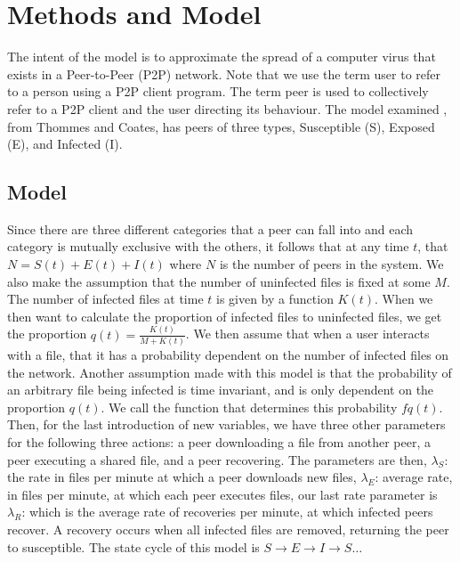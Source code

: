 \documentclass[12pt, oneside]{article}
\begin{document}
    \section{Methods and Model}
    
        The intent of the model is to approximate the spread of a computer virus that exists in a Peer-to-Peer (P2P) network. Note that we use the term user
        to refer to a person using a P2P client program. The term peer is used to collectively refer to a P2P client and the user directing its behaviour.
        The model examined \cite{1689197}, from Thommes and Coates, has peers of three types, Susceptible (S), Exposed (E), and Infected (I). 
    \subsection{Model}
        Since there are three different categories that a peer can fall into and each category is mutually exclusive with the others,
        it follows that at any time $t$, that  $N=S(t)+E(t)+I(t)$ where  $N$ is the number of peers in the system. We also make the assumption that the number of uninfected files is fixed at some $M$.
        The number of infected files at time  $t$ is given by a function  $K(t)$. When we then want to calculate the proportion of infected
        files to uninfected files, we get the proportion  $q(t)=\frac{K(t)}{M+K(t)}$. We then assume that when a user interacts with a file,
        that it has a probability dependent on the number of infected files on the network. Another assumption made with this model
        is that the probability of an arbitrary file being infected is time invariant, and is only dependent on the proportion $q(t)$.
        We call the function that determines this probability  $f{q(t)}$. Then, for the last introduction of new variables, we have three
        other parameters for the following three actions: a peer downloading a file from another peer, a peer executing a shared file, 
        and a peer recovering. The parameters are then,  $\lambda_S$:  the rate in files per minute at which a peer downloads new files, 
        $\lambda_E$: average rate, in files per minute, at which each peer executes files, our last rate parameter is  $\lambda_R$:
        which is the average rate of recoveries per minute, at which infected peers recover. A recovery occurs when all infected files are
        removed, returning the peer to susceptible. The state cycle of this model is  $S\to E\to I \to S\ldots$\newline
\end{document}
